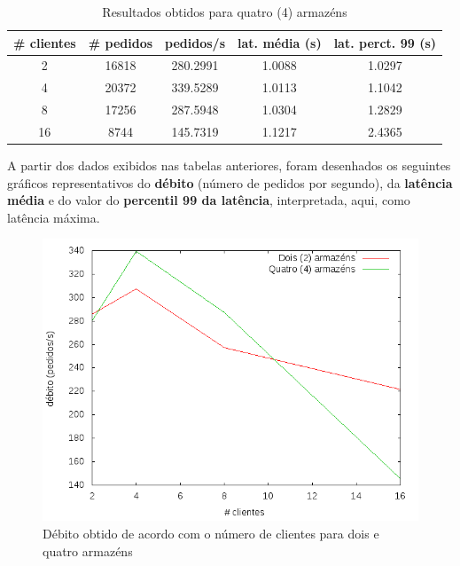 \begin{table}[!h]
\center
\small
\begin{tabular}{|c|c|c|c|c|}
\hline
\textbf{\# clientes} & \textbf{\# pedidos} & \textbf{pedidos/s} & \textbf{lat. média (s)} & \textbf{lat. perct. 99 (s)}  \\ \hline
2 & 16818 & 280.2991 & 1.0088 & 1.0297  \\ \hline
4 & 20372 & 339.5289 & 1.0113 & 1.1042  \\ \hline
8 & 17256 & 287.5948 & 1.0304 & 1.2829  \\ \hline
16 & 8744 & 145.7319 & 1.1217 & 2.4365  \\ \hline
\end{tabular}
\caption{Resultados obtidos para quatro (4) armazéns}
\end{table}

\newpage

A partir dos dados exibidos nas tabelas anteriores, foram desenhados os seguintes gráficos representativos do \textbf{débito} (número de pedidos por segundo), da \textbf{latência média} e do valor do \textbf{percentil 99 da latência}, interpretada, aqui, como latência máxima.

\begin{figure}[!h]
\centering
\includegraphics[scale=.4]{img/questao-1/rep-read-deb}
\caption{Débito obtido de acordo com o número de clientes para dois e quatro armazéns}
\end{figure}

